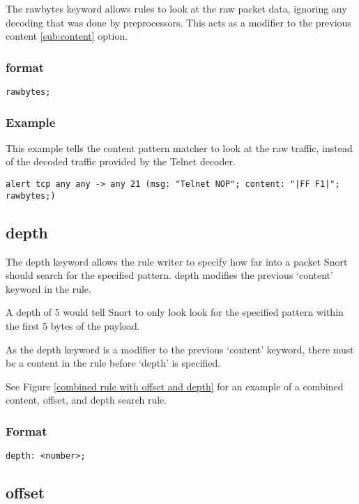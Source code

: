 \documentclass[english]{report}
\begin{document}
The rawbytes keyword allows rules to look at the raw packet data, ignoring any
decoding that was done by preprocessors.  This acts as a modifier to the
previous content \ref{sub:content} option. 

\subsubsection{format}

\begin{verbatim}
rawbytes;
\end{verbatim}

\subsubsection{Example}

This example tells the content pattern matcher to look at the raw traffic,
instead of the decoded traffic provided by the Telnet decoder.
\begin{verbatim}
alert tcp any any -> any 21 (msg: "Telnet NOP"; content: "|FF F1|"; rawbytes;)
\end{verbatim}


\subsection{depth\label{sub:depth}}

The depth keyword allows the rule writer to specify how far into a packet Snort
should search for the specified pattern.  depth modifies the previous `content'
keyword in the rule.

A depth of 5 would tell Snort to only look look for the specified pattern
within the first 5 bytes of the payload.

As the depth keyword is a modifier to the previous `content' keyword, there
must be a content in the rule before `depth' is specified.

See Figure \ref{combined rule with offset and depth} for an example of a
combined content, offset, and depth search rule.

\subsubsection{Format}

\begin{verbatim}
depth: <number>;
\end{verbatim}

\subsection{offset\label{sub:offset}}
\end{document}
